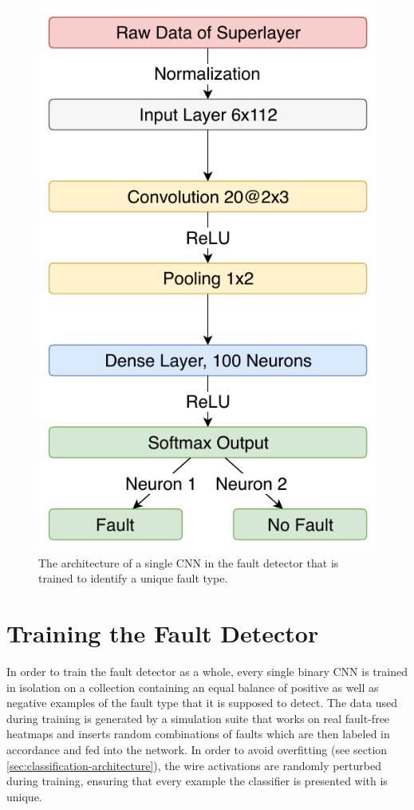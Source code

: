 \begin{figure}[h]
  \centering
  \includegraphics[height=.5\textheight]{../figures/fault_architecture}
  \caption{The architecture of a single CNN in the fault detector that
  is trained to identify a unique fault type.}
  \label{fig:fault-architecture}
\end{figure}

\section{Training the Fault Detector}

In order to train the fault detector as a whole, every single binary
CNN is trained in isolation on a collection containing an equal
balance of positive as well as negative examples of the fault type
that it is supposed to detect. The data used during training is
generated by a simulation suite that works on real fault-free heatmaps
and inserts random combinations of faults which are then labeled in
accordance and fed into the network. In order to avoid overfitting
(see section \ref{sec:classification-architecture}), the wire activations
are randomly perturbed during training, ensuring that every example
the classifier is presented with is unique.

